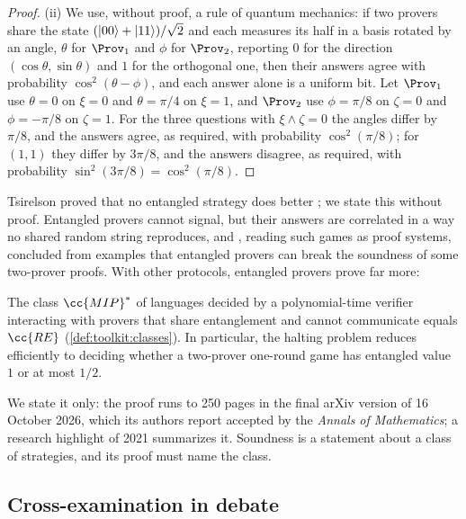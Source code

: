 \begin{refsection}
\begin{proof}
(ii) We use, without proof, a rule of quantum mechanics: if two provers share the state $(\lvert00\rangle+\lvert11\rangle)/\sqrt2$ and each measures its half in a basis rotated by an angle, $\theta$ for $\Prov_1$ and $\phi$ for $\Prov_2$, reporting $0$ for the direction $(\cos\theta,\sin\theta)$ and $1$ for the orthogonal one, then their answers agree with probability $\cos^2(\theta-\phi)$, and each answer alone is a uniform bit. Let $\Prov_1$ use $\theta=0$ on $\xi=0$ and $\theta=\pi/4$ on $\xi=1$, and $\Prov_2$ use $\phi=\pi/8$ on $\zeta=0$ and $\phi=-\pi/8$ on $\zeta=1$. For the three questions with $\xi\wedge\zeta=0$ the angles differ by $\pi/8$, and the answers agree, as required, with probability $\cos^2(\pi/8)$; for $(1,1)$ they differ by $3\pi/8$, and the answers disagree, as required, with probability $\sin^2(3\pi/8)=\cos^2(\pi/8)$.
\end{proof}

Tsirelson proved that no entangled strategy does better \parencite{Tsirelson1980}; we state this without proof. Entangled provers cannot signal, but their answers are correlated in a way no shared random string reproduces, and \textcite{CleveEtAl2004}, reading such games as proof systems, concluded from examples that entangled provers can break the soundness of some two-prover proofs. With other protocols, entangled provers prove far more:

\begin{theorem}[$\cc{MIP}^*=\cc{RE}$; \textcite{JiEtAl2021}]\label{thm:crossexam:mipstar}
The class $\cc{MIP}^*$ of languages decided by a polynomial-time verifier interacting with provers that share entanglement and cannot communicate equals $\cc{RE}$ (\cref{def:toolkit:classes}). In particular, the halting problem reduces efficiently to deciding whether a two-prover one-round game has entangled value $1$ or at most $1/2$.
\end{theorem}

We state it only: the proof runs to 250 pages in the final arXiv version of 16 October 2026, which its authors report accepted by the \emph{Annals of Mathematics}; a research highlight of 2021 summarizes it. Soundness is a statement about a class of strategies, and its proof must name the class.

\subsection{Cross-examination in debate}\label{sec:crossexam:debate}


\end{refsection}
